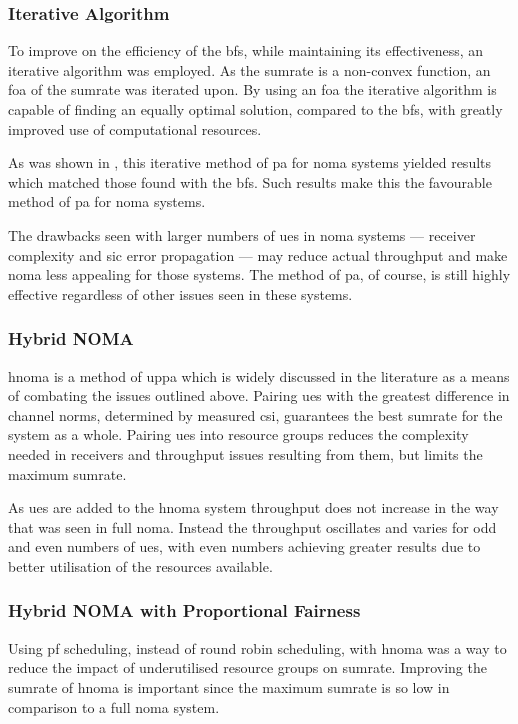 \subsubsection{Iterative Algorithm}
To improve on the efficiency of the \ac{bfs}, while maintaining its effectiveness, an iterative algorithm was employed.
As the sumrate is a non-convex function, an \ac{foa} of the sumrate was iterated upon.
By using an \ac{foa} the iterative algorithm is capable of finding an equally optimal solution, compared to the \ac{bfs}, with greatly improved use of computational resources. 

\par
As was shown in , this iterative method of \ac{pa} for \ac{noma} systems yielded results which matched those found with the \ac{bfs}.
Such results make this the favourable method of \ac{pa} for \ac{noma} systems.

\par
The drawbacks seen with larger numbers of \acp{ue} in \ac{noma} systems --- receiver complexity and \ac{sic} error propagation --- may reduce actual throughput and make \ac{noma} less appealing for those systems.
The method of \ac{pa}, of course, is still highly effective regardless of other issues seen in these systems.

\subsubsection{Hybrid NOMA}
\ac{hnoma} is a method of \ac{uppa} which is widely discussed in the literature as a means of combating the issues outlined above. 
Pairing \acp{ue} with the greatest difference in channel norms, determined by measured \ac{csi}, guarantees the best sumrate for the system as a whole.
Pairing \acp{ue} into resource groups reduces the complexity needed in receivers and throughput issues resulting from them, but limits the maximum sumrate.

\par
As \acp{ue} are added to the \ac{hnoma} system throughput does not increase in the way that was seen in full \ac{noma}.
Instead the throughput oscillates and varies for odd and even numbers of \acp{ue}, with even numbers achieving greater results due to better utilisation of the resources available.

\subsubsection{Hybrid NOMA with Proportional Fairness}
Using \ac{pf} scheduling, instead of round robin scheduling, with \ac{hnoma} was a way to reduce the impact of underutilised resource groups on sumrate.
Improving the sumrate of \ac{hnoma} is important since the maximum sumrate is so low in comparison to a full \ac{noma} system.

